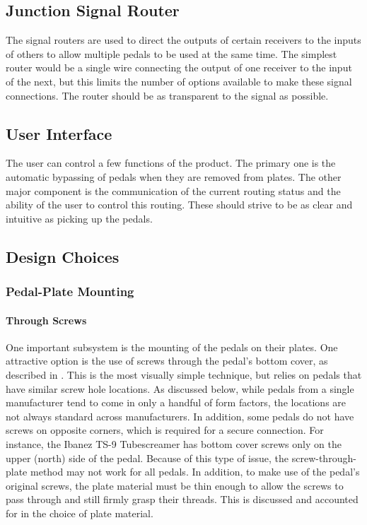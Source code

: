 \documentclass{article}
\begin{document}
	\subsection{Junction Signal Router}
	The signal routers are used to direct the outputs of certain receivers to the inputs of others to allow multiple pedals to be used at the same time.  The simplest router would be a single wire connecting the output of one receiver to the input of the next, but this limits the number of options available to make these signal connections.  The router should be as transparent to the signal as possible.

	\subsection{User Interface}
	The user can control a few functions of the product.  The primary one is the automatic bypassing of pedals when they are removed from plates.  The other major component is the communication of the current routing status and the ability of the user to control this routing.  These should strive to be as clear and intuitive as picking up the pedals.	
	
	\subsection{Design Choices}
		\subsubsection{Pedal-Plate Mounting}
		
			\paragraph{Through Screws}
			One important subsystem is the mounting of the pedals on their plates.  One attractive option is the use of screws through the pedal's bottom cover, as described in \cite{ABBATE:2016}.  This is the most visually simple technique, but relies on pedals that have similar screw hole locations.  As discussed below, while pedals from a single manufacturer tend to come in only a handful of form factors, the locations are not always standard across manufacturers.  In addition, some pedals do not have screws on opposite corners, which is required for a secure connection.  For instance, the Ibanez TS-9 Tubescreamer has bottom cover screws only on the upper (north) side of the pedal.  Because of this type of issue, the screw-through-plate method may not work for all pedals.  {
			In addition, to make use of the pedal's original screws, the plate material must be thin enough to allow the screws to pass through and still firmly grasp their threads.  This is discussed and accounted for in the choice of plate material.}
\end{document}
